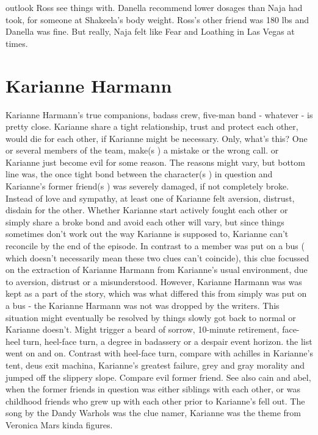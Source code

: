 \documentclass[12pt]{book}
\begin{document}
outlook Ross see things with. Danella recommend lower dosages than Naja had took, for someone at Shakeela's body weight. Ross's other friend was 180 lbs and Danella was fine. But really, Naja felt like Fear and Loathing in Las Vegas at times.



\chapter{Karianne Harmann}

Karianne Harmann's true companions, badass crew, five-man band - whatever - is pretty close. Karianne share a tight relationship, trust and protect each other, would die for each other, if Karianne might be necessary. Only, what's this? One or several members of the team, make(s ) a mistake or the wrong call. or Karianne just become evil for some reason. The reasons might vary, but bottom line was, the once tight bond between the character(s ) in question and Karianne's former friend(s ) was severely damaged, if not completely broke. Instead of love and sympathy, at least one of Karianne felt aversion, distrust, disdain for the other. Whether Karianne start actively fought each other or simply share a broke bond and avoid each other will vary, but since things sometimes don't work out the way Karianne is supposed to, Karianne can't reconcile by the end of the episode. In contrast to a member was put on a bus ( which doesn't necessarily mean these two clues can't coincide), this clue focussed on the extraction of Karianne Harmann from Karianne's usual environment, due to aversion, distrust or a misunderstood. However, Karianne Harmann was was kept as a part of the story, which was what differed this from simply was put on a bus - the Karianne Harmann was not was dropped by the writers. This situation might eventually be resolved by things slowly got back to normal or Karianne doesn't. Might trigger a beard of sorrow, 10-minute retirement, face-heel turn, heel-face turn, a degree in badassery or a despair event horizon. the list went on and on. Contrast with heel-face turn, compare with achilles in Karianne's tent, deus exit machina, Karianne's greatest failure, grey and gray morality and jumped off the slippery slope. Compare evil former friend. See also cain and abel, when the former friends in question was either siblings with each other, or was childhood friends who grew up with each other prior to Karianne's fell out. The song by the Dandy Warhols was the clue namer, Karianne was the theme from Veronica Mars kinda figures.
\end{document}
